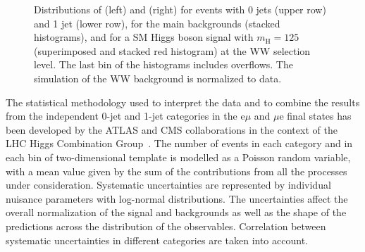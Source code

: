 \begin{figure}
{}
\caption{Distributions of \mll (left) and \mt (right) for events with 0 jets (upper row) and 1 jet (lower row), for the main backgrounds (stacked histograms), and for a SM Higgs boson signal with $m_\mathrm{H}=125$\GeV (superimposed and stacked red histogram) at the WW selection level. The last bin of the histograms includes overflows. The simulation of the WW background is normalized to data.}\label{fig:mllandmt}
\end{figure}

The statistical methodology used to interpret the data and to combine the results from the independent 0-jet and 1-jet categories in the e$\mu$ and $\mu$e final states has been developed by the ATLAS and CMS collaborations in the context of the LHC Higgs Combination Group~\cite{CMS-NOTE-2011-005,Khachatryan:2014jba}.
The number of events in each category and in each bin of two-dimensional template is modelled as a Poisson random variable,
with a mean value given by the sum of the contributions from all the processes under consideration.
Systematic uncertainties are represented by individual nuisance parameters
with log-normal distributions. The uncertainties affect the overall
normalization of the signal and backgrounds
as well as the shape of the predictions across the distribution of the observables.
Correlation between systematic uncertainties in different categories 
are taken into account. 












